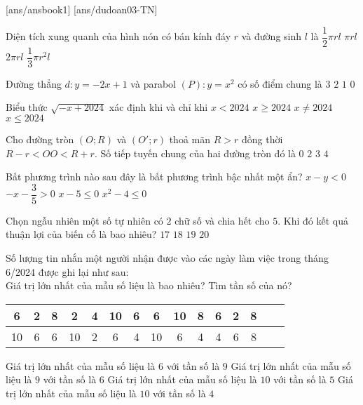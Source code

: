 \begin{name}
	{\tenchude}
	{\tendethi}
	{\tentruong}
	{\thoigian}
\end{name}

[ans/ansbook1]
[ans/dudoan03-TN]
\begin{ex}
[NB] Diện tích xung quanh của hình nón có bán kính đáy $r$ và đường sinh $l$ là
\choice
{$\dfrac{1}{2}\pi rl$}
{\True $\pi rl$}
{$2\pi rl$}
{$\dfrac{1}{3}\pi r^2l$}
\end{ex}
\begin{ex}
[NB] Đường thẳng $d\colon y=-2x+1$ và parabol $(P)\colon y=x^2$ có số điểm chung là
\choice
{$3$}
{\True $2$}
{$1$}
{$0$}
\end{ex}
\begin{ex}
[NB] Biểu thức $\sqrt{-x+2024}$ xác định khi và chỉ khi
\choice
{$x<2024$}
{$x\ge 2024$}
{$x\ne 2024$}
{\True $x\le 2024$}
\end{ex}
\begin{ex}
[VD] Cho đường tròn $(O;R)$ và $(O';r)$ thoả mãn $R>r$ đồng thời $R-r<OO<R+r$. Số tiếp tuyến chung của hai đường tròn đó là
\choice
{$0$}
{\True $2$}
{$3$}
{$4$}
\end{ex}
\begin{ex}
[NB] Bất phương trình nào sau đây là bất phương trình bậc nhất một ẩn?
\choice
{$x-y<0$}
{\True $-x-\dfrac{3}{5}>0$}
{$x-5\le 0$}
{$x^2-4\le 0$}
\end{ex}
\begin{ex}
[NB] Chọn ngẫu nhiên một số tự nhiên có $2$ chữ số và chia hết cho $5$. Khi đó kết quả thuận lợi của biến cố là bao nhiêu?
\choice
{$17$}
{\True $18$}
{$19$}
{$20$}
\end{ex}
\begin{ex}
[NB] Số lượng tin nhắn một người nhận được vào các ngày làm việc trong tháng 6/2024 được ghi lại như sau:\\
Giá trị lớn nhất của mẫu số liệu là bao nhiêu? Tìm tần số của nó?
\begin{table}[h!]
\centering
\begin{tabular}{|c|c|c|c|c|c|c|c|c|c|c|c|c|c|c|}
\hline
6 & 2 & 8 & 2 & 4 & 10 & 6 & 6 & 10 & 8 & 6 & 2 & 8 \\
\hline
10 & 6 & 6 & 10 & 2 & 6 & 4 & 10 & 6 & 4 & 4 & 6 & 8 \\
\hline
\end{tabular}
\end{table}
\choice
{Giá trị lớn nhất của mẫu số liệu là $6$ với tần số là $9$}
{Giá trị lớn nhất của mẫu số liệu là $9$ với tần số là $6$}
{\True Giá trị lớn nhất của mẫu số liệu là $10$ với tần số là $5$}
{Giá trị lớn nhất của mẫu số liệu là $10$ với tần số là $4$}
\end{ex}
